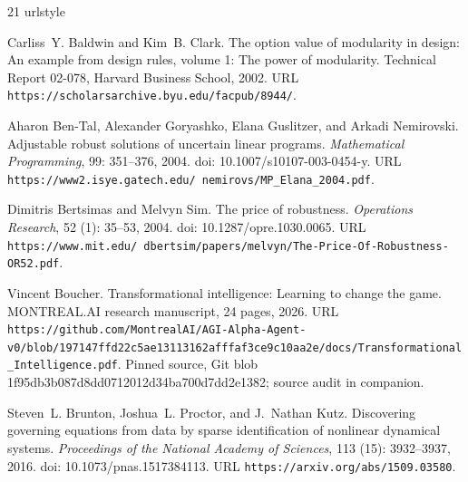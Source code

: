\documentclass[11pt,letterpaper]{article}
\begin{document}
\begingroup
\raggedright
\small
\setlength{\bibsep}{.4em}
\begin{thebibliography}{21}
\providecommand{\natexlab}[1]{#1}
\providecommand{\url}[1]{\texttt{#1}}
\expandafter\ifx\csname urlstyle\endcsname\relax
  \providecommand{\doi}[1]{doi: #1}\else
  \providecommand{\doi}{doi: \begingroup \urlstyle{rm}\Url}\fi

Carliss~Y. Baldwin and Kim~B. Clark.
\newblock The option value of modularity in design: An example from design
  rules, volume 1: The power of modularity.
\newblock Technical Report 02-078, Harvard Business School, 2002.
\newblock URL \url{https://scholarsarchive.byu.edu/facpub/8944/}.

Aharon Ben-Tal, Alexander Goryashko, Elana Guslitzer, and Arkadi Nemirovski.
\newblock Adjustable robust solutions of uncertain linear programs.
\newblock \emph{Mathematical Programming}, 99: 351--376, 2004.
\newblock \doi{10.1007/s10107-003-0454-y}.
\newblock URL \url{https://www2.isye.gatech.edu/~nemirovs/MP_Elana_2004.pdf}.

Dimitris Bertsimas and Melvyn Sim.
\newblock The price of robustness.
\newblock \emph{Operations Research}, 52 (1): 35--53, 2004.
\newblock \doi{10.1287/opre.1030.0065}.
\newblock URL
  \url{https://www.mit.edu/~dbertsim/papers/melvyn/The-Price-Of-Robustness-OR52.pdf}.

Vincent Boucher.
\newblock Transformational intelligence: Learning to change the game.
\newblock MONTREAL.AI research manuscript, 24 pages, 2026.
\newblock URL
  \url{https://github.com/MontrealAI/AGI-Alpha-Agent-v0/blob/197147ffd22c5ae13113162afffaf3ce9c10aa2e/docs/Transformational_Intelligence.pdf}.
\newblock Pinned source, Git blob 1f95db3b087d8dd0712012d34ba700d7dd2e1382;
  source audit in companion.

Steven~L. Brunton, Joshua~L. Proctor, and J.~Nathan Kutz.
\newblock Discovering governing equations from data by sparse identification of
  nonlinear dynamical systems.
\newblock \emph{Proceedings of the National Academy of Sciences}, 113
  (15): 3932--3937, 2016.
\newblock \doi{10.1073/pnas.1517384113}.
\newblock URL \url{https://arxiv.org/abs/1509.03580}.


\end{thebibliography}
\end{document}
